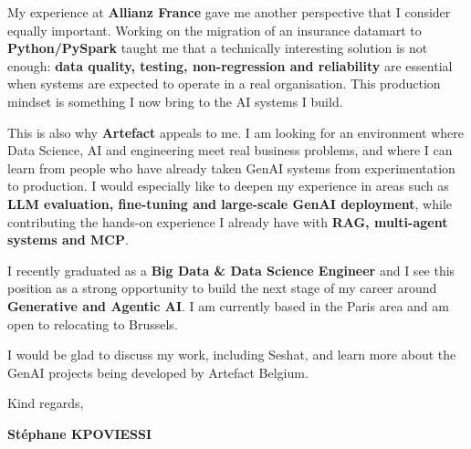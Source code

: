 \documentclass[letterpaper,11pt]{article}
\begin{document}
My experience at \textbf{Allianz France} gave me another perspective that I consider equally important. Working on the migration of an insurance datamart to \textbf{Python/PySpark} taught me that a technically interesting solution is not enough: \textbf{data quality, testing, non-regression and reliability} are essential when systems are expected to operate in a real organisation. This production mindset is something I now bring to the AI systems I build.

This is also why \textbf{Artefact} appeals to me. I am looking for an environment where Data Science, AI and engineering meet real business problems, and where I can learn from people who have already taken GenAI systems from experimentation to production. I would especially like to deepen my experience in areas such as \textbf{LLM evaluation, fine-tuning and large-scale GenAI deployment}, while contributing the hands-on experience I already have with \textbf{RAG, multi-agent systems and MCP}.

I recently graduated as a \textbf{Big Data \& Data Science Engineer} and I see this position as a strong opportunity to build the next stage of my career around \textbf{Generative and Agentic AI}. I am currently based in the Paris area and am open to relocating to Brussels.

I would be glad to discuss my work, including Seshat, and learn more about the GenAI projects being developed by Artefact Belgium.

\vspace{0.4cm}

Kind regards,

\vspace{0.6cm}

{\color{primary}\textbf{Stéphane KPOVIESSI}}
\end{document}

